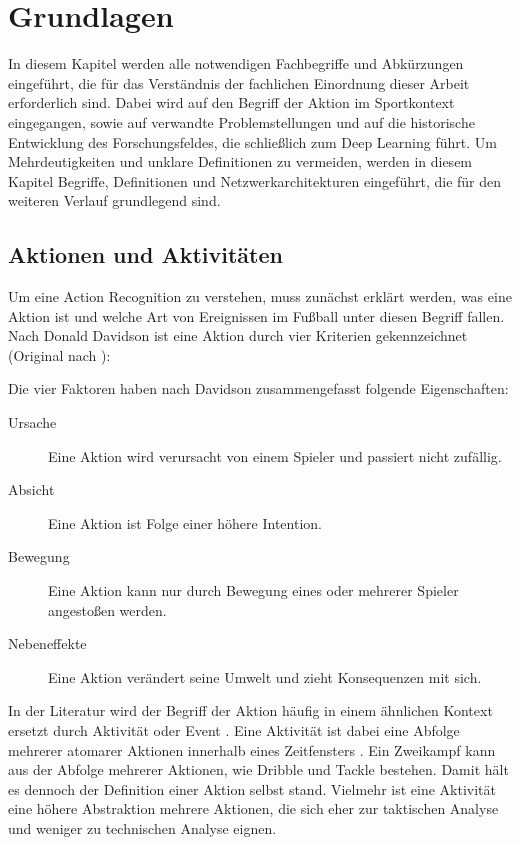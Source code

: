 \chapter{Grundlagen}
\label{ch:basics}

In diesem Kapitel werden alle notwendigen Fachbegriffe und Abkürzungen eingeführt, die für das Verständnis der fachlichen Einordnung dieser Arbeit erforderlich sind.
Dabei wird auf den Begriff der Aktion im Sportkontext eingegangen, sowie auf verwandte Problemstellungen und auf die historische Entwicklung des Forschungsfeldes, die schließlich zum Deep Learning führt.
Um Mehrdeutigkeiten und unklare Definitionen zu vermeiden, werden in diesem Kapitel Begriffe, Definitionen und Netzwerkarchitekturen eingeführt, die für den weiteren Verlauf grundlegend sind.


\section{Aktionen und Aktivitäten}
\label{sec:aktionen-und-aktivitaeten}

Um eine Action Recognition zu verstehen, muss zunächst erklärt werden, was eine Aktion ist und welche Art von Ereignissen im Fußball unter diesen Begriff fallen.
Nach Donald Davidson ist eine Aktion durch vier Kriterien gekennzeichnet \cite{Chen14} (Original nach \cite{Davidson63}):


Die vier Faktoren haben nach Davidson zusammengefasst folgende Eigenschaften:
\begin{description}
    \item[Ursache] Eine Aktion wird verursacht von einem Spieler und passiert nicht zufällig.
    \item[Absicht] Eine Aktion ist Folge einer höhere Intention.
    \item[Bewegung] Eine Aktion kann nur durch Bewegung eines oder mehrerer Spieler angestoßen werden.
    \item[Nebeneffekte] Eine Aktion verändert seine Umwelt und zieht Konsequenzen mit sich.
\end{description}

In der Literatur wird der Begriff der Aktion häufig in einem ähnlichen Kontext ersetzt durch Aktivität oder Event \cite{Giancola18}.
Eine Aktivität ist dabei eine Abfolge mehrerer atomarer Aktionen innerhalb eines Zeitfensters \cite{Dai17}.
Ein Zweikampf kann \zB aus der Abfolge mehrerer Aktionen, wie Dribble und Tackle bestehen.
Damit hält es dennoch der Definition einer Aktion selbst stand.
Vielmehr ist eine Aktivität eine höhere Abstraktion mehrere Aktionen, die sich eher zur taktischen Analyse und weniger zu technischen Analyse eignen.

